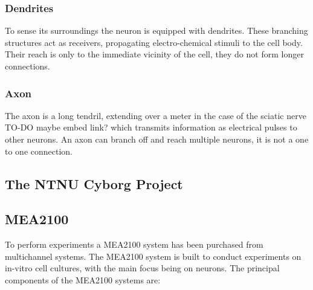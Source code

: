 \subsubsection{Dendrites}
To sense its surroundings the neuron is equipped with dendrites. These
branching structures act as receivers, propagating electro-chemical stimuli to
the cell body. Their reach is only to the immediate vicinity of the cell, they
do not form longer connections.
\subsubsection{Axon}
The axon is a long tendril, extending over a meter in the case of the sciatic
nerve TO-DO maybe embed link? which transmits information as electrical pulses
to other neurons. An axon can branch off and reach multiple neurons, it is not a
one to one connection.
\subsection{The NTNU Cyborg Project}
\subsection{MEA2100}
To perform experiments a MEA2100 system has been purchased from multichannel systems.
The MEA2100 system is built to conduct experiments on in-vitro cell cultures, 
with the main focus being on neurons.
The principal components of the MEA2100 systems are:
